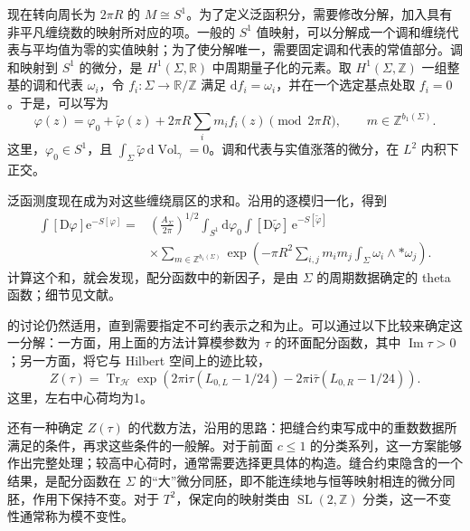现在转向周长为 $2\pi R$ 的 $M\cong S^1$。为了定义泛函积分，需要修改分解，加入具有非平凡缠绕数的映射所对应的项。一般的 $S^1$ 值映射，可以分解成一个调和缠绕代表与平均值为零的实值映射；为了使分解唯一，需要固定调和代表的常值部分。调和映射到 $S^1$ 的微分，是 $H^1(\Sigma,\mathbb{R})$ 中周期量子化的元素。取 $H^1(\Sigma,\mathbb{Z})$ 一组整基的调和代表 $\omega_i$，令 $f_i\colon\Sigma\to\mathbb{R}/\mathbb{Z}$ 满足 $\mathrm{d}f_i=\omega_i$，并在一个选定基点处取 $f_i=0$。于是，可以写为
\begin{equation}\label{eq:3.54}
\varphi(z)=\varphi_0+\widetilde\varphi(z)
+2\pi R\sum_i m_i f_i(z)\pmod{2\pi R},
\qquad m\in\mathbb{Z}^{b_1(\Sigma)}.
\end{equation}
这里，$\varphi_0\in S^1$，且 $\int_\Sigma\widetilde\varphi\,\mathrm{d}\operatorname{Vol}_\gamma=0$。调和代表与实值涨落的微分，在 $L^2$ 内积下正交。

泛函测度现在成为对这些缠绕扇区的求和。沿用的逐模归一化，得到
\begin{equation}\label{eq:3.55}
\begin{aligned}
\int[\mathrm{D}\varphi]\mathrm{e}^{-S[\varphi]}
={}&\left(\frac{A_\Sigma}{2\pi}\right)^{1/2}
\int_{S^1}\mathrm{d}\varphi_0
\int[\mathrm{D}\widetilde\varphi]\,
\mathrm{e}^{-S[\widetilde\varphi]}\\
&\times\sum_{m\in\mathbb{Z}^{b_1(\Sigma)}}
\exp\left(-\pi R^2\sum_{i,j}m_i m_j
\int_\Sigma\omega_i\wedge*\omega_j\right).
\end{aligned}
\end{equation}
计算这个和，就会发现，配分函数中的新因子，是由 $\Sigma$ 的周期数据确定的 theta 函数；细节见文献。

的讨论仍然适用，直到需要指定不可约表示之和为止。可以通过以下比较来确定这一分解：一方面，用上面的方法计算模参数为 $\tau$ 的环面配分函数，其中 $\operatorname{Im}\tau>0$；另一方面，将它与 Hilbert 空间上的迹比较，
\begin{equation}\label{eq:3.56}
Z(\tau)=\operatorname{Tr}_{\mathcal{H}}
\exp\left(2\pi\mathrm{i}\tau(L_{0,L}-1/24)
-2\pi\mathrm{i}\bar\tau(L_{0,R}-1/24)\right).
\end{equation}
这里，左右中心荷均为1。

还有一种确定 $Z(\tau)$ 的代数方法，沿用的思路：把缝合约束写成中的重数数据所满足的条件，再求这些条件的一般解。对于前面 $c\le1$ 的分类系列，这一方案能够作出完整处理；较高中心荷时，通常需要选择更具体的构造。缝合约束隐含的一个结果，是配分函数在 $\Sigma$ 的“大”微分同胚，即不能连续地与恒等映射相连的微分同胚，作用下保持不变。对于 $T^2$，保定向的映射类由 $\operatorname{SL}(2,\mathbb{Z})$ 分类，这一不变性通常称为模不变性。

